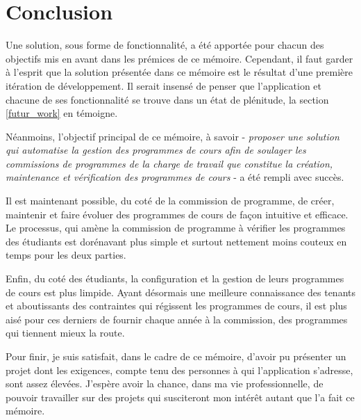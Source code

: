 \chapter{Conclusion}
\label{conclusion}
Une solution, sous forme de fonctionnalité, a été apportée pour chacun des objectifs mis en avant dans les prémices de ce mémoire. Cependant, il faut garder à l'esprit que la solution présentée dans ce mémoire est le résultat d'une première itération de développement. Il serait insensé de penser que l'application et chacune de ses fonctionnalité se trouve dans un état de plénitude, la section \ref{futur_work} en témoigne. 

Néanmoins, l'objectif principal de ce mémoire, à savoir - \textit{proposer une solution qui automatise la gestion des programmes de cours afin de soulager les commissions de programmes de la charge de travail que constitue la création, maintenance et vérification des programmes de cours} - a été rempli avec succès.

Il est maintenant possible, du coté de la commission de programme, de créer, maintenir et faire évoluer des programmes de cours de façon intuitive et efficace. Le processus, qui amène la commission de programme à vérifier les programmes des étudiants est dorénavant plus simple et surtout nettement moins couteux en temps pour les deux parties.

Enfin, du coté des étudiants, la configuration et la gestion de leurs programmes de cours est plus limpide. Ayant désormais une meilleure connaissance des tenants et aboutissants des contraintes qui régissent les programmes de cours, il est plus aisé pour ces derniers de fournir chaque année à la commission,  des programmes qui tiennent mieux la route. 

Pour finir, je suis satisfait, dans le cadre de ce mémoire, d'avoir pu présenter un projet dont les exigences, compte tenu des personnes à qui l'application s'adresse, sont assez élevées. J'espère avoir la chance, dans ma vie professionnelle, de pouvoir travailler sur des projets qui susciteront mon intérêt autant que l'a fait ce mémoire.

